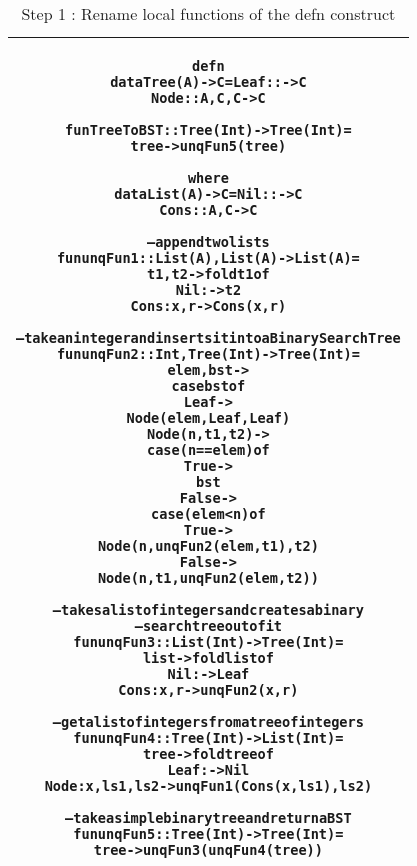 \documentclass[11pt]{article}
\begin{document}
\begin{table}
\begin{center}
\begin{tabular}{|c|}\hline
\begin{minipage}{5in}
\begin{alltt}

  defn
    data Tree(A) -> C = Leaf :: -> C
                        Node :: A,C,C -> C

    fun TreeToBST :: Tree(Int) -> Tree(Int) =
      tree -> unqFun5(tree)

  where 
    data List(A) -> C = Nil  ::     -> C
                        Cons :: A,C -> C 
    
    -- append two lists
    fun unqFun1 :: List(A),List(A) -> List(A) =
      t1,t2 -> fold t1 of
                 Nil  :    -> t2
                 Cons :x,r -> Cons(x,r)

    -- take an integer and inserts it into a Binary Search Tree 
    fun unqFun2 :: Int,Tree(Int) -> Tree(Int) =
      elem,bst ->
        case bst of
          Leaf -> 
            Node (elem,Leaf,Leaf) 
          Node(n,t1,t2) -> 
            case (n == elem) of
              True  -> 
                bst 
              False ->
                case (elem < n) of
                  True ->
                    Node (n,unqFun2 (elem,t1),t2)
                  False ->
                    Node (n,t1,unqFun2 (elem,t2))

    -- takes a list of integers and creates a binary
    -- search tree out of it
    fun unqFun3 :: List(Int) -> Tree(Int) =
      list -> fold list of
                Nil  :     -> Leaf
                Cons : x,r -> unqFun2 (x,r)  
    
    -- get a list of integers from a tree of integers
    fun unqFun4 :: Tree(Int) -> List(Int) = 
      tree -> fold tree of
                Leaf : -> Nil
                Node :x,ls1,ls2 -> unqFun1 (Cons(x,ls1),ls2)

    -- take a simple binary tree and return a BST
    fun unqFun5 :: Tree(Int) -> Tree(Int) =
      tree -> unqFun3 (unqFun4 (tree))

\end{alltt} 
\end {minipage} 
\tabularnewline
\hline
\end{tabular}
\caption{Step 1 : Rename local functions of the {\sf defn} construct}
\label{lam:LamLiftDefn1}
\end{center}
\end{table}
\end{document}
